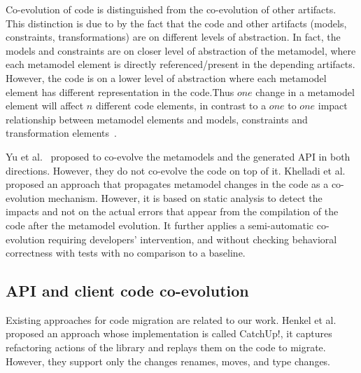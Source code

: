  Co-evolution of code is distinguished from the co-evolution of other artifacts. This distinction is due to by the fact that the code and other artifacts (models, constraints, transformations) are on different levels of abstraction. In fact, the models and constraints are on closer level of abstraction of the metamodel, where each metamodel element is directly referenced/present in the depending artifacts. However, the code is on a lower level of abstraction where each  metamodel element has different representation in the code.Thus $one$ change in a metamodel element will affect $n$ different code elements, in contrast to a $one$ to $one$ impact relationship between metamodel elements and models, constraints and transformation elements~\cite{kessentini2018integrating,kessentini2019automated,cicchetti2008automating,herrmannsdoerfer2009cope,garces2009managing,wachsmuth2007metamodel,batot2017heuristic,khelladi2017semi,correa2007refactoring,kessentini2018automated,khelladi2018change,garces2014adapting,10.1007/978-3-642-36089-3_9,kusel2015consistent,kusel2015systematic}.
 
 Yu et al.~\cite{yu2012maintaining} proposed to co-evolve the metamodels and the generated API in both directions. However, they do not co-evolve the code on top of it.%
 Khelladi et al.~\cite{Khelladi2020} proposed an approach that propagates metamodel changes in the code as a co-evolution mechanism. However, it is based on static analysis to detect the impacts and not on the actual errors that appear from the compilation of the code after the metamodel evolution. It further applies a semi-automatic co-evolution requiring developers' intervention, and without checking behavioral correctness with tests with no comparison to a baseline. 
 
 
 \subsection{API and client code co-evolution}
 \label{API_evolution}
 
 
 Existing approaches for code migration are related to our work. %
   Henkel et al.~\cite{henkel2005catchup} proposed an approach whose implementation is called CatchUp!, it captures refactoring actions of the library and replays them on the code to migrate. However, they support only the changes renames, moves, and type changes. 
 
